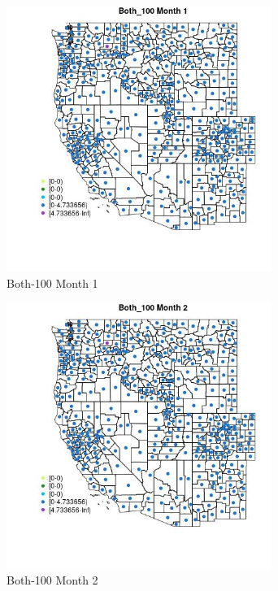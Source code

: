 \begin{figure} 
\centering  
\includegraphics[width=0.77\textwidth]{Code_Outputs/df_report_ML_predictors_CountyCentroid_Locations_Dates_2008-01-01to2018-12-31_MapObsMo1Both_100.jpg} 
\caption{\label{fig:df_report_ML_predictors_CountyCentroid_Locations_Dates_2008-01-01to2018-12-31MapObsMo1Both_100}Both-100 Month 1} 
\end{figure} 
 

\begin{figure} 
\centering  
\includegraphics[width=0.77\textwidth]{Code_Outputs/df_report_ML_predictors_CountyCentroid_Locations_Dates_2008-01-01to2018-12-31_MapObsMo2Both_100.jpg} 
\caption{\label{fig:df_report_ML_predictors_CountyCentroid_Locations_Dates_2008-01-01to2018-12-31MapObsMo2Both_100}Both-100 Month 2} 
\end{figure} 
 

